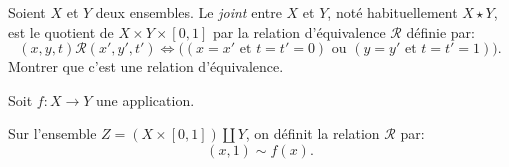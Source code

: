 \begin{exercice}
Soient $X$ et $Y$ deux ensembles. Le \emph{joint} entre $X$ et $Y$, noté habituellement $X\star Y$, est le quotient de $X\times Y\times [0,1]$ par la relation d'équivalence $\mathcal R$ définie par:
\[ (x,y,t)\mathcal R (x',y',t') \iff \big( (x=x'\text{ et }t=t'=0) \text{ ou } (y=y'\text{ et }t=t'=1)\big).\]
Montrer que c'est une relation d'équivalence.
\end{exercice}

\begin{exercice}
Soit $f : X\to Y$ une application. 

Sur l'ensemble $Z = (X\times [0,1] )\amalg Y$, on définit la relation $\mathcal R$ par:
\[ (x,1) \sim f(x).\]
\end{exercice}

